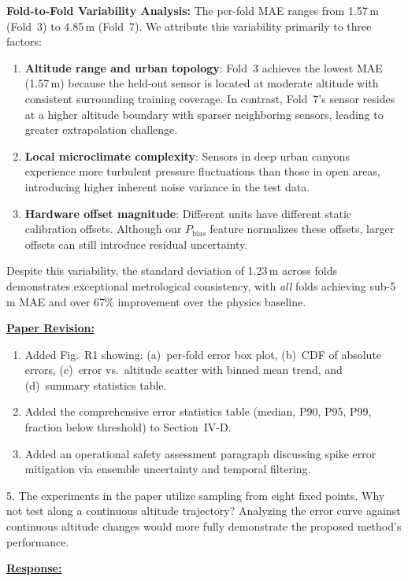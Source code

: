 \textbf{Fold-to-Fold Variability Analysis:}
The per-fold MAE ranges from 1.57\,m (Fold~3) to 4.85\,m (Fold~7). We attribute this variability primarily to three factors:
\begin{enumerate}
    \item \textbf{Altitude range and urban topology}: Fold~3 achieves the lowest MAE (1.57\,m) because the held-out sensor is located at moderate altitude with consistent surrounding training coverage. In contrast, Fold~7's sensor resides at a higher altitude boundary with sparser neighboring sensors, leading to greater extrapolation challenge.
    \item \textbf{Local microclimate complexity}: Sensors in deep urban canyons experience more turbulent pressure fluctuations than those in open areas, introducing higher inherent noise variance in the test data.
    \item \textbf{Hardware offset magnitude}: Different units have different static calibration offsets. Although our $P_{\text{bias}}$ feature normalizes these offsets, larger offsets can still introduce residual uncertainty.
\end{enumerate}

Despite this variability, the standard deviation of 1.23\,m across folds demonstrates exceptional metrological consistency, with \emph{all} folds achieving sub-5\,m MAE and over 67\% improvement over the physics baseline.

\vspace{0.1cm}
\noindent
\underline{\textbf{Paper Revision:}}

\begin{enumerate}
    \item Added Fig.~R1 showing: (a)~per-fold error box plot, (b)~CDF of absolute errors, (c)~error vs.\ altitude scatter with binned mean trend, and (d)~summary statistics table.
    \item Added the comprehensive error statistics table (median, P90, P95, P99, fraction below threshold) to Section~IV-D.
    \item Added an operational safety assessment paragraph discussing spike error mitigation via ensemble uncertainty and temporal filtering.
\end{enumerate}

\newpage

\begin{cmtone}{}{}
5. The experiments in the paper utilize sampling from eight fixed points. Why not test along a continuous altitude trajectory? Analyzing the error curve against continuous altitude changes would more fully demonstrate the proposed method's performance.

\end{cmtone}
\vspace{0.1cm}
\noindent
\underline{\textbf{Response:}}
\vspace{0.2cm}

